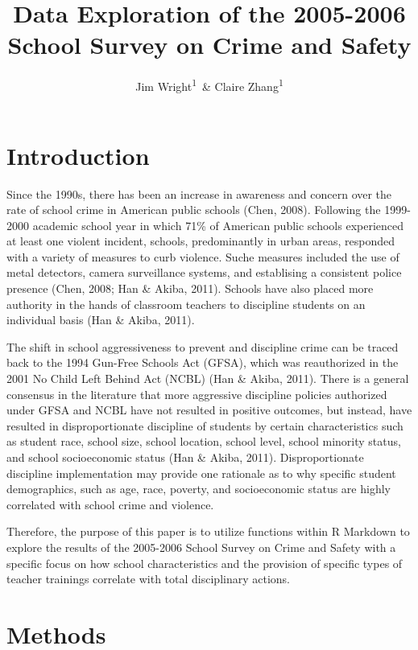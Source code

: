 \documentclass[man]{apa6}
\title{Data Exploration of the 2005-2006 School Survey on Crime and Safety}
\author{Jim Wright\textsuperscript{1}~\& Claire Zhang\textsuperscript{1}}
\date{}
\affiliation{
\vspace{0.5cm}
\textsuperscript{1} University of Oregon}
\begin{document}
\maketitle

\hypertarget{introduction}{%
\section{Introduction}\label{introduction}}

Since the 1990s, there has been an increase in awareness and concern over the rate of school crime in American public schools (Chen, 2008). Following the 1999-2000 academic school year in which 71\% of American public schools experienced at least one violent incident, schools, predominantly in urban areas, responded with a variety of measures to curb violence. Suche measures included the use of metal detectors, camera surveillance systems, and establising a consistent police presence (Chen, 2008; Han \& Akiba, 2011). Schools have also placed more authority in the hands of classroom teachers to discipline students on an individual basis (Han \& Akiba, 2011).

The shift in school aggressiveness to prevent and discipline crime can be traced back to the 1994 Gun-Free Schools Act (GFSA), which was reauthorized in the 2001 No Child Left Behind Act (NCBL) (Han \& Akiba, 2011). There is a general consensus in the literature that more aggressive discipline policies authorized under GFSA and NCBL have not resulted in positive outcomes, but instead, have resulted in disproportionate discipline of students by certain characteristics such as student race, school size, school location, school level, school minority status, and school socioeconomic status (Han \& Akiba, 2011). Disproportionate discipline implementation may provide one rationale as to why specific student demographics, such as age, race, poverty, and socioeconomic status are highly correlated with school crime and violence.

Therefore, the purpose of this paper is to utilize functions within R Markdown to explore the results of the 2005-2006 School Survey on Crime and Safety with a specific focus on how school characteristics and the provision of specific types of teacher trainings correlate with total disciplinary actions.

\hypertarget{methods}{%
\section{Methods}\label{methods}}
\end{document}
